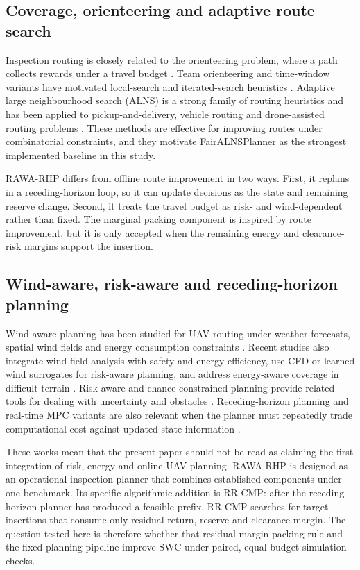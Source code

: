 \documentclass[preprint,12pt]{elsarticle}
\begin{document}
\subsection{Coverage, orienteering and adaptive route search}

Inspection routing is closely related to the orienteering problem, where a path collects rewards under a travel budget \cite{Vansteenwegen_2011}. Team orienteering and time-window variants have motivated local-search and iterated-search heuristics \cite{Vansteenwegen_2009}. Adaptive large neighbourhood search (ALNS) is a strong family of routing heuristics and has been applied to pickup-and-delivery, vehicle routing and drone-assisted routing problems \cite{Ropke_2006,Mattos_Ribeiro_2012,Sacramento_2019}. These methods are effective for improving routes under combinatorial constraints, and they motivate FairALNSPlanner as the strongest implemented baseline in this study.

RAWA-RHP differs from offline route improvement in two ways. First, it replans in a receding-horizon loop, so it can update decisions as the state and remaining reserve change. Second, it treats the travel budget as risk- and wind-dependent rather than fixed. The marginal packing component is inspired by route improvement, but it is only accepted when the remaining energy and clearance-risk margins support the insertion.

\subsection{Wind-aware, risk-aware and receding-horizon planning}

Wind-aware planning has been studied for UAV routing under weather forecasts, spatial wind fields and energy consumption constraints \cite{Thanellas_2019,Thibbotuwawa_2019,Lin_2024,Lian_2025,Gu_2026}. Recent studies also integrate wind-field analysis with safety and energy efficiency, use CFD or learned wind surrogates for risk-aware planning, and address energy-aware coverage in difficult terrain \cite{Gu_2026,VeigaPineiro_2025,Shao_2025}. Risk-aware and chance-constrained planning provide related tools for dealing with uncertainty and obstacles \cite{Blackmore_2011,Song_2018,Cai_2021,Nakka_2023}. Receding-horizon planning and real-time MPC variants are also relevant when the planner must repeatedly trade computational cost against updated state information \cite{Mandalika_2018,Ahmed_Sheltami_2024,Hu_2026,Qiu_2026}.

These works mean that the present paper should not be read as claiming the first integration of risk, energy and online UAV planning. RAWA-RHP is designed as an operational inspection planner that combines established components under one benchmark. Its specific algorithmic addition is RR-CMP: after the receding-horizon planner has produced a feasible prefix, RR-CMP searches for target insertions that consume only residual return, reserve and clearance margin. The question tested here is therefore whether that residual-margin packing rule and the fixed planning pipeline improve SWC under paired, equal-budget simulation checks.
\end{document}
